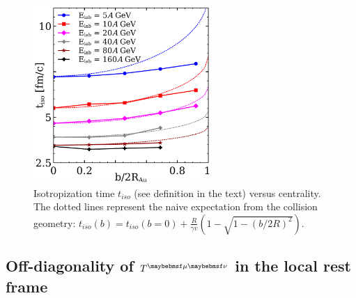 \begin{figure}
  \includegraphics[width = 0.6\textwidth]{plots/thermalization_urqmd/t_x_vs_b.pdf}
  \caption{Isotropization time $t_{iso}$ (see definition in the text) versus
           centrality. The dotted lines represent the naive expectation from the
           collision geometry: $t_{iso}(b) = t_{iso}(b = 0) +
           \frac{R}{\gamma v} (1 - \sqrt{1 - (b/2R)^2})$.}
  \label{FIG:t_x_b}
\end{figure}

\subsection{Off-diagonality of $\Tmn$ in the local rest frame}

